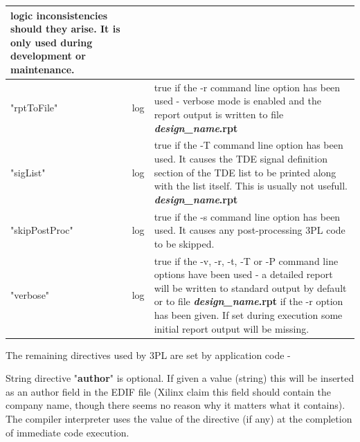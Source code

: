 \begin{tabular}{| l | l | p{10.0cm} |}
                                     logic inconsistencies should they arise. It
                                     is only used during development or
                                     maintenance.
        \\ \hline
        "rptToFile"         & log &  true if the -r command line option has
                                     been used - verbose mode is enabled and
                                     the report output is written to file
                                     {\bf {\em design\_name}.rpt}
        \\ \hline
        "sigList"           & log &  true if the -T command line option has
                                     been used. It causes the TDE signal definition
                                     section of the TDE list to be printed along
                                     with the list itself. This is usually not
                                     usefull.
                                     {\bf {\em design\_name}.rpt}
        \\ \hline
        "skipPostProc"      & log &  true if the -s command line option has
                                     been used. It causes any post-processing
                                     3PL code to be skipped.
        \\ \hline
        "verbose"           & log &  true if the -v, -r, -t, -T or -P command
                                     line options have been used - a detailed
                                     report will be written to standard output by
                                     default or to file {\bf {\em
                                     design\_name}.rpt} if the -r option has been
                                     given. If set during execution some initial
                                     report output will be missing.
        \\ \hline
        \end{tabular}


        The remaining directives used by 3PL are set by application code -

        String directive "{\bf author}" is optional. If given a value
        (string) this will be inserted as an author field in the EDIF file
        (Xilinx claim this field should contain the company name, though there
        seems no reason why it matters what it contains). The compiler
        interpreter uses the value of the directive (if any) at the completion
        of immediate code execution.

